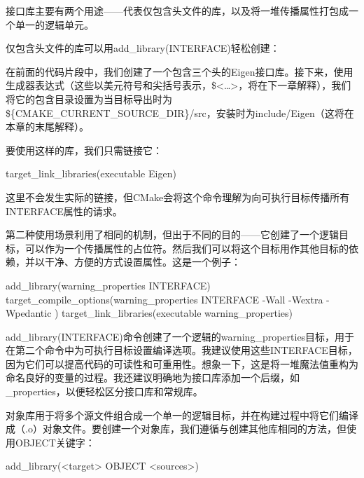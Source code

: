 接口库主要有两个用途——代表仅包含头文件的库，以及将一堆传播属性打包成一个单一的逻辑单元。

仅包含头文件的库可以用add\_library(INTERFACE)轻松创建：


在前面的代码片段中，我们创建了一个包含三个头的Eigen接口库。接下来，使用生成器表达式（这些以美元符号和尖括号表示，\$<…>，将在下一章解释），我们将它的包含目录设置为当目标导出时为\$\{CMAKE\_CURRENT\_SOURCE\_DIR\}/src，安装时为include/Eigen（这将在本章的末尾解释）。

要使用这样的库，我们只需链接它：

\begin{cmake}
target_link_libraries(executable Eigen)
\end{cmake}

这里不会发生实际的链接，但CMake会将这个命令理解为向可执行目标传播所有INTERFACE属性的请求。

第二种使用场景利用了相同的机制，但出于不同的目的——它创建了一个逻辑目标，可以作为一个传播属性的占位符。然后我们可以将这个目标用作其他目标的依赖，并以干净、方便的方式设置属性。这是一个例子：

\begin{cmake}
add_library(warning_properties INTERFACE)
target_compile_options(warning_properties INTERFACE
    -Wall -Wextra -Wpedantic
)
target_link_libraries(executable warning_properties)
\end{cmake}

add\_library(INTERFACE)命令创建了一个逻辑的warning\_properties目标，用于在第二个命令中为可执行目标设置编译选项。我建议使用这些INTERFACE目标，因为它们可以提高代码的可读性和可重用性。想象一下，这是将一堆魔法值重构为命名良好的变量的过程。我还建议明确地为接口库添加一个后缀，如\_properties，以便轻松区分接口库和常规库。


对象库用于将多个源文件组合成一个单一的逻辑目标，并在构建过程中将它们编译成（.o）对象文件。要创建一个对象库，我们遵循与创建其他库相同的方法，但使用OBJECT关键字：

\begin{shell}
add_library(<target> OBJECT <sources>)
\end{shell}

